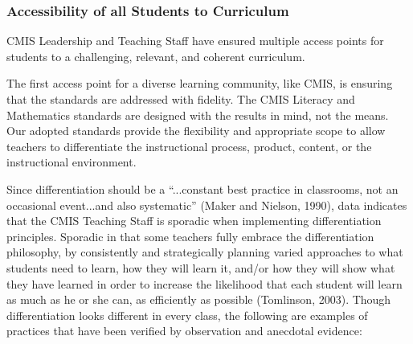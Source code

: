 \subsubsection{Accessibility of all Students to Curriculum}



\begin{findings}
CMIS Leadership and Teaching Staff have ensured multiple access points for students to a challenging, relevant, and coherent curriculum. 


The first access point for a diverse learning community, like CMIS, is ensuring that the standards are addressed with fidelity. The CMIS Literacy and Mathematics standards are designed with the results in mind, not the means. Our adopted standards provide the flexibility and appropriate scope to allow teachers to differentiate the instructional process, product, content, or the instructional environment. 

Since differentiation should be a “...constant best practice in classrooms, not an occasional event...and also systematic” (Maker and Nielson, 1990), data indicates that the CMIS Teaching Staff is sporadic when implementing differentiation principles. Sporadic in that some teachers fully embrace the differentiation philosophy, by consistently and strategically planning varied approaches to what students need to learn, how they will learn it, and/or how they will show what they have learned in order to increase the likelihood that each student will learn as much as he or she can, as efficiently as possible (Tomlinson, 2003). Though differentiation looks different in every class, the following are examples of practices that have been verified by observation and anecdotal evidence:
 

\end{findings}

